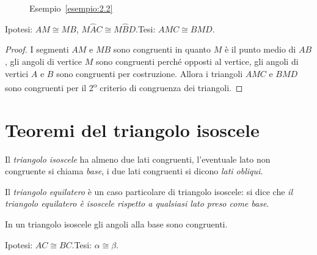 \begin{exrig}
\begin{esempio}
\begin{inaccessibleblock}
 \begin{figure}[htb]
\centering
\caption{Esempio~\ref{esempio:2.2}}\label{fig:esempio2.2}
\end{figure}
\end{inaccessibleblock}

\noindent Ipotesi: \(AM\cong MB\), \(M\widehat{A}C\cong 
M\widehat{B}D\).\tab Tesi: \(AMC\cong BMD\).

\begin{proof}
I segmenti \(AM\) e \(MB\) sono congruenti in quanto \(M\) è il punto medio 
di \(AB\), gli angoli di vertice \(M\) sono congruenti perché opposti al 
vertice, gli angoli di vertici \(A\) e \(B\) sono congruenti per 
costruzione. Allora i triangoli \(AMC\) e \(BMD\) sono congruenti per il 
2\textsuperscript{o} criterio di congruenza dei triangoli.
\end{proof}
\end{esempio}
\end{exrig}

\section{Teoremi del triangolo 
isoscele}\label{sect:teoremi_triangolo_isoscele}

Il \emph{triangolo isoscele} ha almeno due lati congruenti, 
l'eventuale lato non congruente si chiama \emph{base}, i due lati 
congruenti si dicono \emph{lati obliqui}.

Il \emph{triangolo equilatero} è un caso particolare di triangolo 
isoscele: si dice che \emph{il triangolo equilatero è isoscele 
rispetto a qualsiasi lato preso come base}.

\begin{teorema}
In un triangolo isoscele gli angoli alla base sono congruenti.
\end{teorema}


\begin{inaccessibleblock}
 \begin{figure}[htb]
\centering
\end{figure}
\end{inaccessibleblock}

\noindent Ipotesi: \(AC\cong BC\).\tab Tesi: \(\alpha\cong \beta\).


